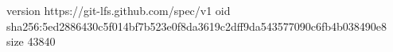 version https://git-lfs.github.com/spec/v1
oid sha256:5ed2886430c5f014bf7b523e0f8da3619c2dff9da543577090c6fb4b038490e8
size 43840
